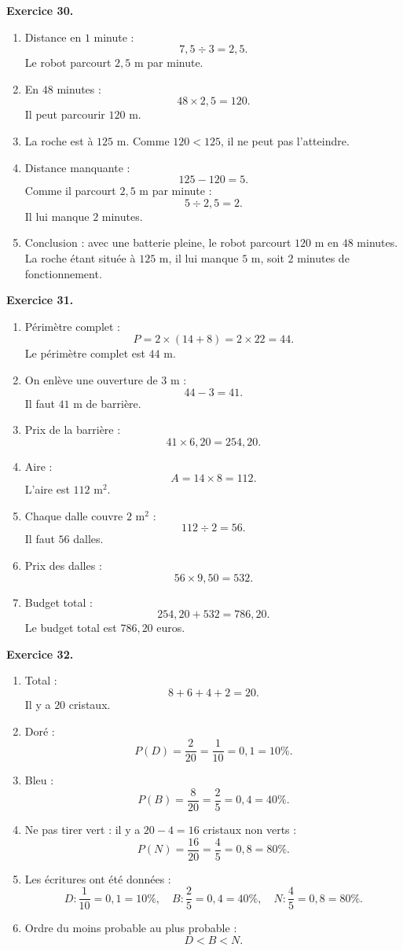 \documentclass[11pt,a4paper]{article}
\newcommand{\corrige}[2]{
\begin{corrigebox}
\textbf{Exercice #1.}

#2
\end{corrigebox}
}
\begin{document}
\corrige{30}{
\begin{enumerate}[label=\arabic*)]
\item Distance en $1$ minute :
\[
7,5\div 3=2,5.
\]
Le robot parcourt $2,5$ m par minute.
\item En $48$ minutes :
\[
48\times 2,5=120.
\]
Il peut parcourir $120$ m.
\item La roche est à $125$ m. Comme $120<125$, il ne peut pas l'atteindre.
\item Distance manquante :
\[
125-120=5.
\]
Comme il parcourt $2,5$ m par minute :
\[
5\div 2,5=2.
\]
Il lui manque $2$ minutes.
\item Conclusion : avec une batterie pleine, le robot parcourt $120$ m en $48$ minutes. La roche étant située à $125$ m, il lui manque $5$ m, soit $2$ minutes de fonctionnement.
\end{enumerate}
}

\corrige{31}{
\begin{enumerate}[label=\arabic*)]
\item Périmètre complet :
\[
P=2\times(14+8)=2\times 22=44.
\]
Le périmètre complet est $44$ m.
\item On enlève une ouverture de $3$ m :
\[
44-3=41.
\]
Il faut $41$ m de barrière.
\item Prix de la barrière :
\[
41\times 6,20=254,20.
\]
\item Aire :
\[
A=14\times 8=112.
\]
L'aire est $112$ m$^2$.
\item Chaque dalle couvre $2$ m$^2$ :
\[
112\div 2=56.
\]
Il faut $56$ dalles.
\item Prix des dalles :
\[
56\times 9,50=532.
\]
\item Budget total :
\[
254,20+532=786,20.
\]
Le budget total est $786,20$ euros.
\end{enumerate}
}

\corrige{32}{
\begin{enumerate}[label=\arabic*)]
\item Total :
\[
8+6+4+2=20.
\]
Il y a $20$ cristaux.
\item Doré :
\[
P(D)=\frac{2}{20}=\frac{1}{10}=0,1=10\%.
\]
\item Bleu :
\[
P(B)=\frac{8}{20}=\frac{2}{5}=0,4=40\%.
\]
\item Ne pas tirer vert : il y a $20-4=16$ cristaux non verts :
\[
P(N)=\frac{16}{20}=\frac{4}{5}=0,8=80\%.
\]
\item Les écritures ont été données :
\[
D:\frac{1}{10}=0,1=10\%,
\quad
B:\frac{2}{5}=0,4=40\%,
\quad
N:\frac{4}{5}=0,8=80\%.
\]
\item Ordre du moins probable au plus probable :
\[
D<B<N.
\]
\end{enumerate}
}
\end{document}
